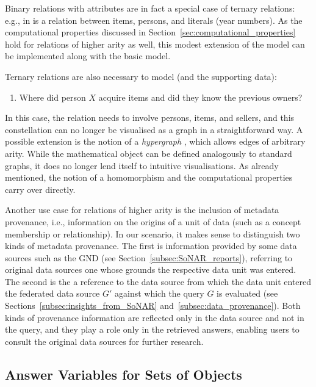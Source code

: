 Binary relations with attributes are in fact a special case of ternary relations: e.g.,  in 
is a relation between items, persons, and literals (year numbers).
As the computational properties discussed in Section~\ref{sec:computational_properties}
hold for relations of higher arity as well, this modest extension of the model can be implemented
along with the basic model.

Ternary relations are also necessary to model  (and the supporting data):
%
\begin{enumerate}
  \item[\exaquery{9}]
    Where did person $X$ acquire items and did they know the previous owners?
\end{enumerate}
%
In this case, the relation  needs to involve persons, items, and sellers,
and this constellation can no longer be visualised as a graph in a straightforward way.
A possible extension is the notion of a \emph{hypergraph} \autocite[§7.1]{Voloshin2009},
which allows edges of arbitrary arity.
While the mathematical object can be defined analogously to standard graphs,
it does no longer lend itself to intuitive visualisations.
As already mentioned, the notion of a homomorphism and the computational properties
carry over directly.

Another use case for relations of higher arity is the inclusion of metadata provenance,
i.e., information on the origins of a unit of data (such as a concept membership or relationship).
In our scenario, it makes sense to distinguish two kinds of
metadata provenance. The first is information provided by some data sources such as the \gls{GND}
(see Section~\ref{subsec:SoNAR_reports}), referring to original data sources one whose grounds
the respective data unit was entered.
The second is the a reference to the data source from which the data unit entered
the federated data source $G'$ against which the query $G$ is evaluated
(see Sections~\ref{subsec:insights_from_SoNAR} and~\ref{subsec:data_provenance}).
Both kinds of provenance information are reflected only in the data source
and not in the query, and they play a role only in the retrieved answers,
enabling users to consult the original data sources for further research.

\subsection{Answer Variables for Sets of Objects}

